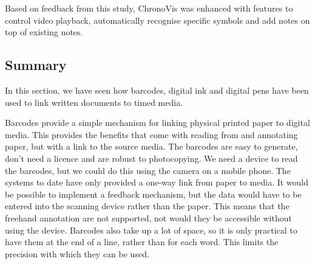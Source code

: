 Based on feedback from this study, ChronoVis was enhanced with features to control video playback, automatically
recognise specific symbols and add notes on top of existing notes.






\subsection{Summary}

In this section, we have seen how barcodes, digital ink and digital pens have been used to link written documents to
timed media.

Barcodes provide a simple mechanism for linking physical printed paper to digital media. This provides the
benefits that come with reading from and annotating paper, but with a link to the source media. The barcodes are easy
to generate, don't need a licence and are robust to photocopying.  We need a device to read the barcodes, but we
could do this using the camera on a mobile phone.  The systems to date have only provided a one-way link from paper to
media.  It would be possible to implement a feedback mechanism, but the data would have to be entered into the scanning
device rather than the paper. This means that the freehand annotation are not supported, not would they be accessible
without using the device. Barcodes also take up a lot of space, so it is only practical to have them at the end
of a line, rather than for each word. This limits the precision with which they can be used.

